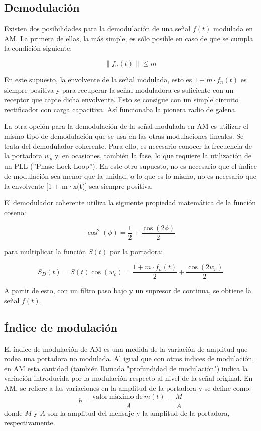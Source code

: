 \documentclass[a4paper]{article}
\begin{document}
\subsection{Demodulaci\'on}

Existen dos posibilidades para la demodulación de una señal $f(t)$ modulada en AM. La primera de ellas, la más simple, es sólo posible en caso de que se cumpla la condición siguiente:

\[\big\| f_n(t) \big\| \leq m \]

En este supuesto, la envolvente de la señal modulada, esto es $1 + m \cdot f_n(t)$ es siempre positiva y para recuperar la señal moduladora es suficiente con un receptor que capte dicha envolvente. Esto se consigue con un simple circuito rectificador con carga capacitiva. Así funcionaba la pionera radio de galena.

La otra opción para la demodulación de la señal modulada en AM es utilizar el mismo tipo de demodulación que se usa en las otras modulaciones lineales. Se trata del demodulador coherente. Para ello, es necesario conocer la frecuencia de la portadora \textit{}{$w_p$} y, en ocasiones, también la fase, lo que requiere la utilización de un PLL (''Phase Lock Loop''). En este otro supuesto, no es necesario que el índice de modulación sea menor que la unidad, o lo que es lo mismo, no es necesario que la envolvente [1 + m·x(t)] sea siempre positiva.

El demodulador coherente utiliza la siguiente propiedad matemática de la función coseno:

\[\cos^2(\phi) = \frac {1}{2} + \frac {\cos(2\phi)}{2}\]

para multiplicar la función $S(t)$ por la portadora:

\[S_D(t) = S(t) \cos(w_c)= \frac{1 + m \cdot f_n(t)}{2} + \frac{\cos(2w_c)}{2}\]

A partir de esto, con un filtro paso bajo y un supresor de continua, se obtiene la señal $f(t)$.

\subsection{Índice de modulación}

El índice de modulación de AM es una medida de la variación de amplitud que rodea una portadora no modulada. Al igual que con otros índices de modulación, en AM esta cantidad (también llamada "profundidad de modulación") indica la variación introducida por la modulación respecto al nivel de la señal original. En AM, se refiere a las variaciones en la amplitud de la portadora y se define como: 
$$h = \frac{\mathrm{valor\ m\acute{a}ximo\  de\ } m(t)}{A} = \frac{M}{A}$$ donde $M$ y $A$ son la amplitud del mensaje y la amplitud de la portadora, respectivamente.
\end{document}
